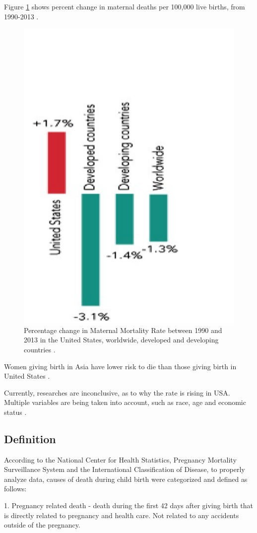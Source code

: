 \documentclass[sigconf]{acmart}
\begin{document}
Figure \ref{fig:figure2} shows percent change in maternal deaths per 100,000 live births, from 1990-2013 \cite{kassebaum2016global}.

\begin{figure}
  \centering
  \includegraphics[width=0.5\columnwidth]{images/figure2.pdf}
  \caption{Percentage change in Maternal Mortality Rate between 1990 and 2013 in the United States, worldwide, developed and developing countries \cite{kassebaum2016global}.} \label{fig:figure2} 
\end{figure}

Women giving birth in Asia have lower risk to die than those giving birth in United States \cite{world2012trends}.

Currently, researches are inconclusive, as to why the rate is rising in USA. Multiple variables are being taken into account, such as race, age and economic status \cite{creanga2012race}.

\subsection{Definition}

According to the National Center for Health Statistics, Pregnancy Mortality Surveillance System and the International Classification of Disease, to properly analyze data, causes of death during child birth were categorized and defined \cite{callaghan2012overview} as follows:


1. Pregnancy related death - death during the first 42 days after giving birth that is directly related to pregnancy and health care. Not related to any accidents outside of the pregnancy.
   
\end{document}
